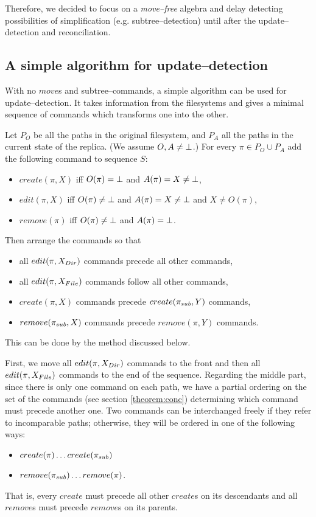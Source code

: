 Therefore, we decided to focus on a \emph{move--free} algebra and delay
detecting possibilities of simplification (e.g. subtree--detection) until
after the update--detection and reconciliation.

\subsection{A simple algorithm for update--detection}
\label{app:upd}

With no \(move\)s and subtree--commands, a simple algorithm can be
used for update--detection. It takes information from the filesystems
and gives a minimal sequence of commands which transforms one into
the other. 

Let \(P_O\) be all the paths in the original
filesystem, and \(P_A\) all the paths in the current state of the replica. 
(We assume \(O,A\ne\bot\).)
For
every \(\pi\in P_O\cup P_A\) add the following command to sequence \(S\):
\begin{itemize}
\item \(create(\pi,X)\) iff \(O(\pi)=\bot\) and \(A(\pi)=X\ne\bot\),
\item \(edit(\pi,X)\) iff \(O(\pi)\ne\bot\) and \(A(\pi)=X\ne\bot\) and
\(X\ne O(\pi)\),
\item \(remove(\pi)\) iff \(O(\pi)\ne\bot\) and \(A(\pi)=\bot\).
\end{itemize}
Then arrange the commands so that
\begin{itemize}
\item all \(edit(\pi,X_{Dir})\) commands precede all other commands, 
\item all \(edit(\pi,X_{File})\) commands follow all other commands,
\item \(create(\pi,X)\) commands precede \(create(\pi_{sub},Y)\) commands,
\item \(remove(\pi_{sub},X)\) commands precede \(remove(\pi,Y)\) commands.
\end{itemize}
This can be done by the method discussed below.

First, we move all \(edit(\pi,X_{Dir})\) commands to the front and then
all \(edit(\pi,X_{File})\) commands to the end of the sequence. 
Regarding the middle part, since there is only one command on each path, we have a partial
ordering on the set of the commands (see section
\ref{theorem:conc}) determining which command must precede another one.
Two commands can be interchanged freely if they refer to incomparable
paths; otherwise, they will be ordered in one of the following ways:
\begin{itemize}
\item \(create(\pi) \ldots create(\pi_{sub})\)
\item \(remove(\pi_{sub}) \ldots remove(\pi)\).
\end{itemize}
That is, every \(create\) must precede all other \(create\)s on its
descendants and all \(remove\)s must precede \(remove\)s on its parents.

